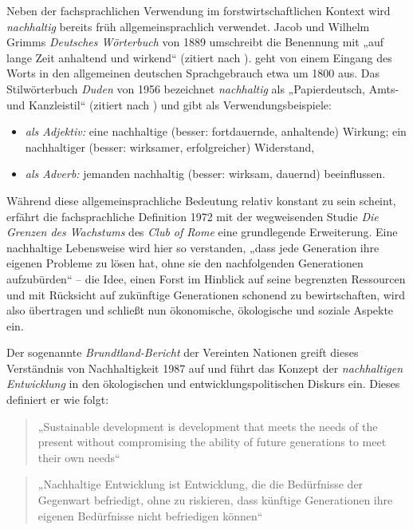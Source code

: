 \documentclass[
    german,
    a4paper,%
    12pt,%
    oneside,%
    toc=bibliography,
    final,
]{scrartcl}
\begin{document}
Neben der fachsprachlichen Verwendung im forstwirtschaftlichen Kontext wird \textit{nachhaltig} bereits früh allgemeinsprachlich verwendet. Jacob und Wilhelm Grimms \textit{Deutsches Wörterbuch} von 1889 umschreibt die Benennung mit „auf lange Zeit anhaltend und wirkend“ (zitiert nach \citealt[145]{Zürcher1965}). \citet[43]{Ninck1997} geht von einem Eingang des Worts in den allgemeinen deutschen Sprachgebrauch etwa um 1800 aus. Das Stilwörterbuch \textit{Duden} von 1956 bezeichnet \textit{nachhaltig} als „Papierdeutsch, Amts- und Kanzleistil“ (zitiert nach \citealt[145]{Zürcher1965}) und gibt als Verwendungsbeispiele:

\begin{itemize}
\item \textit{als Adjektiv:} eine nachhaltige (besser: fortdauernde, anhaltende) Wirkung; ein nachhaltiger (besser: wirksamer, erfolgreicher) Widerstand,
\item \textit{als Adverb:} jemanden nachhaltig (besser: wirksam, dauernd) beeinflussen.
\end{itemize}

Während diese allgemeinsprachliche Bedeutung relativ konstant zu sein scheint, erfährt die fachsprachliche Definition 1972 mit der wegweisenden Studie \textit{Die Grenzen des Wachstums} des \textit{Club of Rome} eine grundlegende Erweiterung. Eine nachhaltige Lebensweise wird hier so verstanden, „dass jede Generation ihre eigenen Probleme zu lösen hat, ohne sie den nachfolgenden Generationen aufzubürden“ \citep[8]{OhlmeierBrunold2015} – die Idee, einen Forst im Hinblick auf seine begrenzten Ressourcen und mit Rücksicht auf zukünftige Generationen schonend zu bewirtschaften, wird also übertragen und schließt nun ökonomische, ökologische und soziale Aspekte ein.

Der sogenannte \textit{Brundtland-Bericht} der Vereinten Nationen greift dieses Verständnis von Nachhaltigkeit 1987 auf und führt das Konzept der \textit{nachhaltigen Entwicklung} in den ökologischen und entwicklungspolitischen Diskurs ein. Dieses definiert er wie folgt:

\begin{quote}
„Sustainable development is development that meets the needs of the present without compromising the ability of future generations to meet their own needs“ \citep{UN1987}
\end{quote}

\begin{quote}
„Nachhaltige Entwicklung ist Entwicklung, die die Bedürfnisse der Gegenwart befriedigt, ohne zu riskieren, dass künftige Generationen ihre eigenen Bedürfnisse nicht befriedigen können“ \citep[Übersetzung durch][51]{Ninck1997}
\end{quote}
\end{document}
